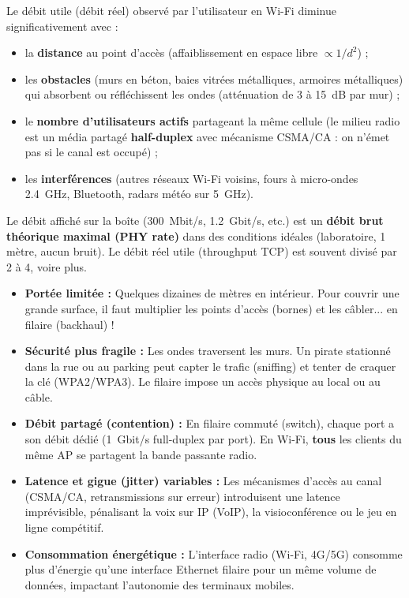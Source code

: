 \documentclass[11pt]{article}
\newcommand{\cle}[1]{{\popxbold\color{popdark}#1}}
\begin{document}
\begin{propriete}
Le débit utile (\cle{débit réel}) observé par l'utilisateur en Wi-Fi diminue significativement avec :
\begin{itemize}
    \item la \textbf{distance} au point d'accès (affaiblissement en espace libre $\propto 1/d^2$) ;
    \item les \textbf{obstacles} (murs en béton, baies vitrées métalliques, armoires métalliques) qui absorbent ou réfléchissent les ondes (atténuation de \SI{3 à 15}{dB} par mur) ;
    \item le \textbf{nombre d'utilisateurs actifs} partageant la même cellule (le milieu radio est un média partagé \textbf{half-duplex} avec mécanisme CSMA/CA : on n'émet pas si le canal est occupé) ;
    \item les \textbf{interférences} (autres réseaux Wi-Fi voisins, fours à micro-ondes \SI{2,4}{GHz}, Bluetooth, radars météo sur \SI{5}{GHz}).
\end{itemize}
Le débit affiché sur la boîte (\SI{300}{Mbit/s}, \SI{1,2}{Gbit/s}, etc.) est un \textbf{débit brut théorique maximal (PHY rate)} dans des conditions idéales (laboratoire, 1 mètre, aucun bruit). Le débit réel utile (throughput TCP) est souvent divisé par 2 à 4, voire plus.
\end{propriete}

\begin{itemize}
    \item \textbf{Portée limitée :} Quelques dizaines de mètres en intérieur. Pour couvrir une grande surface, il faut multiplier les points d'accès (bornes) et les câbler... en filaire (backhaul) !
    \item \textbf{Sécurité plus fragile :} Les ondes traversent les murs. Un pirate stationné dans la rue ou au parking peut capter le trafic (sniffing) et tenter de craquer la clé (WPA2/WPA3). Le filaire impose un accès physique au local ou au câble.
    \item \textbf{Débit partagé (contention) :} En filaire commuté (switch), chaque port a son débit dédié (\SI{1}{Gbit/s} full-duplex par port). En Wi-Fi, \textbf{tous} les clients du même AP se partagent la bande passante radio.
    \item \textbf{Latence et gigue (jitter) variables :} Les mécanismes d'accès au canal (CSMA/CA, retransmissions sur erreur) introduisent une latence imprévisible, pénalisant la voix sur IP (VoIP), la visioconférence ou le jeu en ligne compétitif.
    \item \textbf{Consommation énergétique :} L'interface radio (Wi-Fi, 4G/5G) consomme plus d'énergie qu'une interface Ethernet filaire pour un même volume de données, impactant l'autonomie des terminaux mobiles.
\end{itemize}
\end{document}
